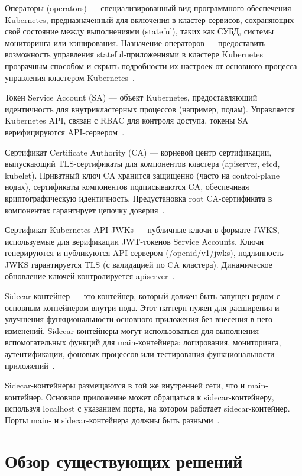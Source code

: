 Операторы (operators) --- специализированный вид программного обеспечения Kubernetes, предназначенный для включения в кластер сервисов, сохраняющих своё состояние между выполнениями (stateful), таких как СУБД, системы мониторинга или кэширования. Назначение операторов — предоставить возможность управления stateful-приложениями в кластере Kubernetes прозрачным способом и скрыть подробности их настроек от основного процесса управления кластером Kubernetes~\cite{kubernetes}.

Токен Service Account (SA) --- объект Kubernetes, предоставляющий идентичность для внутрикластерных процессов (например, подам). Управляется Kubernetes API, связан с RBAC для контроля доступа, токены SA верифицируются API-сервером~\cite{kubernetes}.

Сертификат Certificate Authority (CA) --- корневой центр сертификации, выпускающий TLS-сертификаты для компонентов кластера (apiserver, etcd, kubelet). Приватный ключ CA хранится защищенно (часто на control-plane нодах), сертификаты компонентов подписываются CA, обеспечивая криптографическую идентичность. Предустановка root CA-сертификата в компонентах гарантирует цепочку доверия~\cite{kubernetes}.

Сертификат Kubernetes API JWKs --- публичные ключи в формате JWKS, используемые для верификации JWT-токенов Service Accounts. Ключи генерируются и публикуются API-сервером (/openid/v1/jwks), подлинность JWKS гарантируется TLS (с валидацией по CA кластера). Динамическое обновление ключей контролируется apiserver~\cite{kubernetes}.

Sidecar-контейнер --- это контейнер, который должен быть запущен рядом с основным контейнером внутри пода. Этот паттерн нужен для расширения и улучшения функциональности основного приложения без внесения в него изменений. Sidecar-контейнеры могут использоваться для выполнения вспомогательных функций для main-контейнера: логирования, мониторинга, аутентификации, фоновых процессов или тестирования функциональности приложений~\cite{sidecar}.

Sidecar-контейнеры размещаются в той же внутренней сети, что и main-контейнер. Основное приложение может обращаться к sidecar-контейнеру, используя localhost с указанием порта, на котором работает sidecar-контейнер. Порты main- и sidecar-контейнера должны быть разными~\cite{sidecar}.


\section{Обзор существующих решений}

